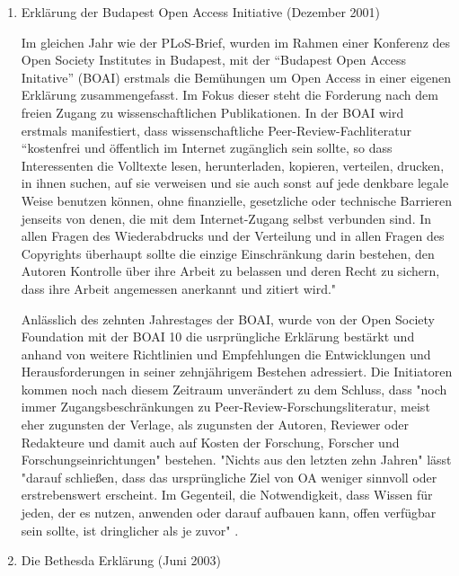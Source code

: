 \begin{enumerate}
\item Erklärung der Budapest Open Access Initiative (Dezember 2001)

Im gleichen Jahr wie der PLoS-Brief, wurden im Rahmen einer Konferenz des Open Society Institutes in Budapest, mit der “Budapest Open Access Initative” (BOAI)\cite{boai_2012} erstmals die Bemühungen um Open Access in einer eigenen Erklärung zusammengefasst\cite{cite:21a}. Im Fokus dieser steht die Forderung nach dem freien Zugang zu wissenschaftlichen Publikationen. In der BOAI wird erstmals manifestiert, dass wissenschaftliche Peer-Review-Fachliteratur “kostenfrei und öffentlich im Internet zugänglich sein sollte, so dass Interessenten die Volltexte lesen, herunterladen, kopieren, verteilen, drucken, in ihnen suchen, auf sie verweisen und sie auch sonst auf jede denkbare legale Weise benutzen können, ohne finanzielle, gesetzliche oder technische Barrieren jenseits von denen, die mit dem Internet-Zugang selbst verbunden sind. In allen Fragen des Wiederabdrucks und der Verteilung und in allen Fragen des Copyrights überhaupt sollte die einzige Einschränkung darin bestehen, den Autoren Kontrolle über ihre Arbeit zu belassen und deren Recht zu sichern, dass ihre Arbeit angemessen anerkannt und zitiert wird."\cite{boai_2012} 

Anlässlich des zehnten Jahrestages der BOAI, wurde von der Open Society Foundation mit der BOAI 10 die usrprüngliche Erklärung bestärkt und anhand von weitere Richtlinien und Empfehlungen die Entwicklungen und Herausforderungen in seiner zehnjährigem Bestehen adressiert. Die Initiatoren kommen noch nach diesem Zeitraum unverändert zu dem Schluss, dass "noch immer Zugangsbeschränkungen zu Peer-Review-Forschungsliteratur, meist eher zugunsten der Verlage, als zugunsten der Autoren, Reviewer oder Redakteure und damit auch auf Kosten der Forschung, Forscher und Forschungseinrichtungen" \cite{boai_2012} bestehen. "Nichts aus den letzten zehn Jahren" lässt "darauf schließen, dass das ursprüngliche Ziel von OA weniger sinnvoll oder erstrebenswert erscheint. Im Gegenteil, die Notwendigkeit, dass Wissen für jeden, der es nutzen, anwenden oder darauf aufbauen kann, offen verfügbar sein sollte, ist dringlicher als je zuvor" \cite{boai_2012}.

\item Die Bethesda Erklärung (Juni 2003)


\end{enumerate}
